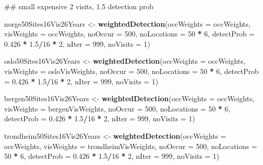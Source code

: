 \documentclass[]{article}
\newenvironment{Shaded}{\begin{snugshade}}{\end{snugshade}}
\newcommand{\KeywordTok}[1]{\textcolor[rgb]{0.13,0.29,0.53}{\textbf{#1}}}
\newcommand{\DataTypeTok}[1]{\textcolor[rgb]{0.13,0.29,0.53}{#1}}
\newcommand{\DecValTok}[1]{\textcolor[rgb]{0.00,0.00,0.81}{#1}}
\newcommand{\FloatTok}[1]{\textcolor[rgb]{0.00,0.00,0.81}{#1}}
\newcommand{\StringTok}[1]{\textcolor[rgb]{0.31,0.60,0.02}{#1}}
\newcommand{\OperatorTok}[1]{\textcolor[rgb]{0.81,0.36,0.00}{\textbf{#1}}}
\newcommand{\NormalTok}[1]{#1}
\begin{document}
\begin{Shaded}
\begin{Highlighting}[]
\NormalTok{## small expensive 2 visits, 1.5 detection prob}

\NormalTok{norge50Sites16Vis26Years <-}\StringTok{ }\KeywordTok{weightedDetection}\NormalTok{(}\DataTypeTok{occWeights =}\NormalTok{ occWeights, }\DataTypeTok{visWeights =}\NormalTok{ occWeights, }
    \DataTypeTok{noOccur =} \DecValTok{500}\NormalTok{, }\DataTypeTok{noLocations =} \DecValTok{50} \OperatorTok{*}\StringTok{ }\DecValTok{6}\NormalTok{, }\DataTypeTok{detectProb =} \FloatTok{0.426} \OperatorTok{*}\StringTok{ }\FloatTok{1.5}\OperatorTok{/}\DecValTok{16} \OperatorTok{*}\StringTok{ }\DecValTok{2}\NormalTok{, }\DataTypeTok{nIter =} \DecValTok{999}\NormalTok{, }
    \DataTypeTok{noVisits =} \DecValTok{1}\NormalTok{)}

\NormalTok{oslo50Sites16Vis26Years <-}\StringTok{ }\KeywordTok{weightedDetection}\NormalTok{(}\DataTypeTok{occWeights =}\NormalTok{ occWeights, }\DataTypeTok{visWeights =}\NormalTok{ osloVisWeights, }
    \DataTypeTok{noOccur =} \DecValTok{500}\NormalTok{, }\DataTypeTok{noLocations =} \DecValTok{50} \OperatorTok{*}\StringTok{ }\DecValTok{6}\NormalTok{, }\DataTypeTok{detectProb =} \FloatTok{0.426} \OperatorTok{*}\StringTok{ }\FloatTok{1.5}\OperatorTok{/}\DecValTok{16} \OperatorTok{*}\StringTok{ }\DecValTok{2}\NormalTok{, }\DataTypeTok{nIter =} \DecValTok{999}\NormalTok{, }
    \DataTypeTok{noVisits =} \DecValTok{1}\NormalTok{)}


\NormalTok{bergen50Sites16Vis26Years <-}\StringTok{ }\KeywordTok{weightedDetection}\NormalTok{(}\DataTypeTok{occWeights =}\NormalTok{ occWeights, }\DataTypeTok{visWeights =}\NormalTok{ bergenVisWeights, }
    \DataTypeTok{noOccur =} \DecValTok{500}\NormalTok{, }\DataTypeTok{noLocations =} \DecValTok{50} \OperatorTok{*}\StringTok{ }\DecValTok{6}\NormalTok{, }\DataTypeTok{detectProb =} \FloatTok{0.426} \OperatorTok{*}\StringTok{ }\FloatTok{1.5}\OperatorTok{/}\DecValTok{16} \OperatorTok{*}\StringTok{ }\DecValTok{2}\NormalTok{, }\DataTypeTok{nIter =} \DecValTok{999}\NormalTok{, }
    \DataTypeTok{noVisits =} \DecValTok{1}\NormalTok{)}


\NormalTok{trondheim50Sites16Vis26Years <-}\StringTok{ }\KeywordTok{weightedDetection}\NormalTok{(}\DataTypeTok{occWeights =}\NormalTok{ occWeights, }\DataTypeTok{visWeights =}\NormalTok{ trondheimVisWeights, }
    \DataTypeTok{noOccur =} \DecValTok{500}\NormalTok{, }\DataTypeTok{noLocations =} \DecValTok{50} \OperatorTok{*}\StringTok{ }\DecValTok{6}\NormalTok{, }\DataTypeTok{detectProb =} \FloatTok{0.426} \OperatorTok{*}\StringTok{ }\FloatTok{1.5}\OperatorTok{/}\DecValTok{16} \OperatorTok{*}\StringTok{ }\DecValTok{2}\NormalTok{, }\DataTypeTok{nIter =} \DecValTok{999}\NormalTok{, }
    \DataTypeTok{noVisits =} \DecValTok{1}\NormalTok{)}



\end{Highlighting}
\end{Shaded}
\end{document}
